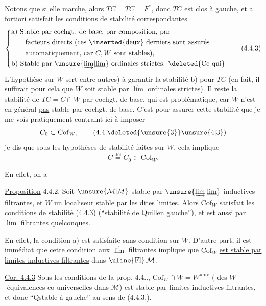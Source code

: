 Notons que si elle marche, alors $TC=\widetilde{TC}=F^*$,
donc $TC$ est clos à gauche, et a fortiori
satisfait les conditions de stabilité correspondantes
\[
\left\{\begin{aligned}
&\text{a) Stable par cochgt. de base, par composition, par}\\
&\qquad\text{facteurs directs (ces \inserted{deux} derniers sont assurés}\\
&\qquad\text{automatiquement, car $C,W$ sont stables),}\\
&\text{b) Stable par $\unsure{\underrightarrow{\lim}|\underline{\lim}}$ ordinales strictes. \deleted{Ce qui}}
\end{aligned}\right. \tag*{(4.4.3)}
\]
 L'hypothèse  sur $W$ sert \unsure{(}entre autres) à garantir
 la stabilité b) pour $TC$ (en fait, il
suffirait pour cela  que $W$ soit stable par
$\underrightarrow{\lim}$ ordinales strictes). Il reste la stabilité
de $TC=C\cap W$ par cochgt. de base, qui
est problématique, car $W$ n'est en général
\uline{pas} stable par cochgt. de base. C'est pour
assurer cette stabilité que je me vois
pratiquement contraint ici à imposer
\[
 C_0\subset\mathrm{Cof}_W,\tag*{(4.4.\deleted{\unsure{3}}\unsure{4|3})}
\]
je dis que sous les hypothèses de stabilité
faites sur $W$, cela implique
\[
 C\overset{\mathrm{déf}}{=}\widetilde C_0\subset\mathrm{Cof}_W.\tag*{(4.4.5)}
\]


En effet, on a

\uline{Proposition} 4.4.2. Soit $\unsure{\mathcal M|M}$ stable par  $\unsure{\underrightarrow{\lim}|\underline{\lim}}$ inductives
filtrantes, et $W$  un localiseur 
\uline{stable par les dites limites}. Alors $\mathrm{Cof}_W$ satisfait les
conditions de stabilité (4.4.3) (``stabilité
de Quillen gauche''), et est  aussi
par $\underrightarrow{\lim}$ filtrantes quelconques.

En effet, la condition a) est satisfaite
sans condition  sur $W$. D'autre part,
il est immédiat que cette condition
 aux $\underrightarrow{\lim}$ filtrantes implique que
$\mathrm{Cof}_W$ \uline{est stable par limites inductives
filtrantes} dans $\uline{\mathrm{Fl}}\,\mathcal M$.

\uline{Cor. 4.4.3} Sous les conditions de la prop.
4.4.., $\mathrm{Cof}_W\cap W=W^{\mathrm{univ}}$ ( des
$W$-équivalences co-universelles dans $\mathcal M$) est
stable par limites inductives filtrantes,
et  donc ``Qstable à gauche''
au sens de (4.4.3.).


